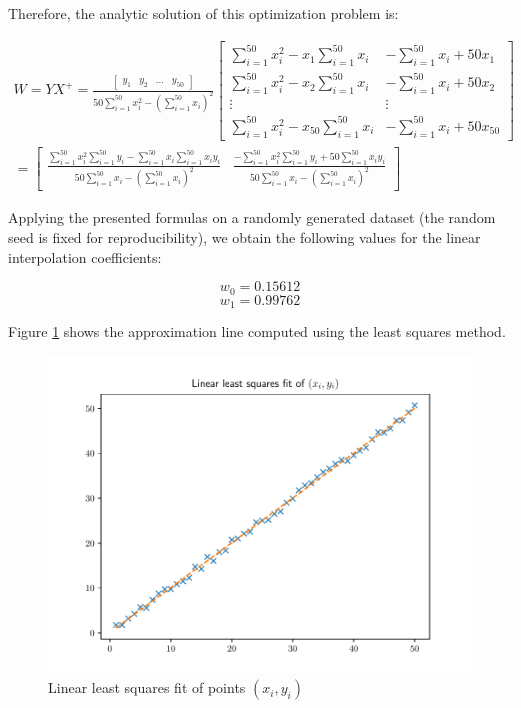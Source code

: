 \documentclass[letterpaper,headings=standardclasses]{scrartcl}
\begin{document}
Therefore, the analytic solution of this optimization problem is:

\begin{multline*}
W = YX^{+} = \frac{\left[ \begin{matrix} y_1 & y_2 & \dots & y_{50} \end{matrix} \right]}{50 \sum_{i = 1}^{50} x_i^2 - \left( \sum_{i = 1}^{50} x_i \right)^2} \left[ \begin{matrix} \sum_{i = 1}^{50} x_i^2 - x_1 \sum_{i = 1}^{50} x_i & -\sum_{i = 1}^{50} x_i + 50 x_1 \\[0.5em] \sum_{i = 1}^{50} x_i^2 - x_2 \sum_{i = 1}^{50} x_i & -\sum_{i = 1}^{50} x_i + 50 x_2 \\[0.5em] \vdots & \vdots \\[0.5em] \sum_{i = 1}^{50} x_i^2 - x_{50} \sum_{i = 1}^{50} x_i & -\sum_{i = 1}^{50} x_i + 50 x_{50} \end{matrix} \right] \\
= \left[ \begin{matrix} \frac{\textstyle \sum_{i = 1}^{50} x_i^2 \sum_{i = 1}^{50} y_i - \sum_{i = 1}^{50} x_i \sum_{i = 1}^{50} x_i y_i}{\textstyle 50 \sum_{i = 1}^{50} x_i - \left( \sum_{i = 1}^{50} x_i \right)^2} & \frac{\textstyle -\sum_{i = 1}^{50} x_i^2 \sum_{i = 1}^{50} y_i + 50 \sum_{i = 1}^{50} x_i y_i}{\textstyle 50 \sum_{i = 1}^{50} x_i - \left( \sum_{i = 1}^{50} x_i \right)^2} \end{matrix} \right]
\end{multline*}

Applying the presented formulas on a randomly generated dataset (the random seed is fixed for reproducibility), we obtain the following values for the linear interpolation coefficients:

$$ w_0 = 0.15612 $$
$$ w_1 = 0.99762 $$

Figure \ref{lls} shows the approximation line computed using the least squares method.

\begin{figure}[h]
\centering
\includegraphics[width=.7\linewidth]{lls.pdf}
\caption{Linear least squares fit of points $(x_i, y_i)$}
\label{lls}
\end{figure}
\end{document}
